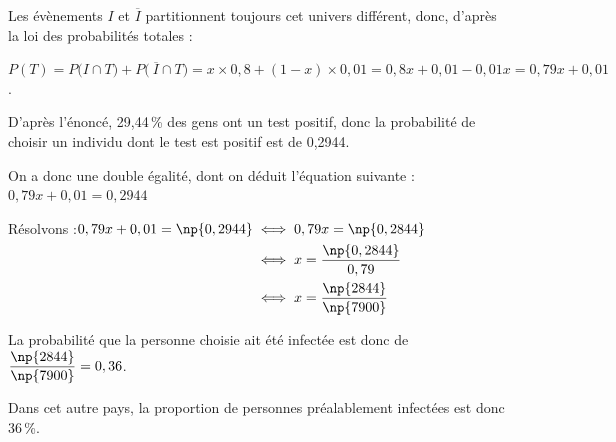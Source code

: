 	Les évènements $I$ et $\overline{I}$ partitionnent toujours cet univers différent, donc, d'après la loi des probabilités totales :

$P(T) = P\big(I\cap T\big) + P\big(~\overline{I} \cap T\big) = x \times 0,8 + (1 - x) \times 0,01 = 0,8x + 0,01 - 0,01x = 0,79x + 0,01$.

D'après l'énoncé, 29,44\,\% des gens ont un test positif, donc la probabilité de choisir un individu dont le test est positif est de 0,2944.

On a donc une double égalité, dont on déduit l'équation suivante : \quad $0,79x + 0,01 = 0,2944$

Résolvons :\quad $\aligned[t] 0,79x + 0,01 = \np{0,2944}&\iff 0,79x = \np{0,2844}\\
&\iff x = \dfrac{\np{0,2844}}{0,79}\\
&\iff x = \dfrac{\np{2844}}{\np{7900}}\endaligned$

La probabilité que la personne choisie ait été infectée est donc de $\dfrac{\np{2844}}{\np{7900}} = 0,36$.

Dans cet autre pays, la proportion de personnes préalablement infectées est donc 36\,\%.

\bigskip

